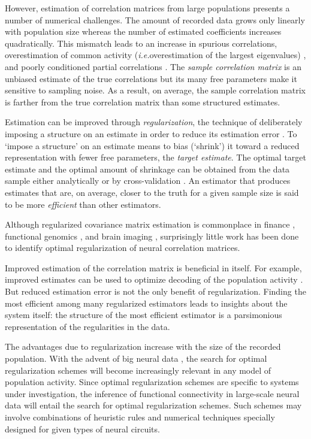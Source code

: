 \documentclass[10pt]{article}
\newcommand{\sq}[1]{\lq#1\rq}
\newcommand{\ie}{\emph{i.e.}\;}
\begin{document}
However, estimation of correlation matrices from large populations presents a number of numerical challenges. The amount of recorded data grows only linearly with population size whereas the number of estimated coefficients increases quadratically. This mismatch leads to an increase in spurious correlations, overestimation of common activity (\ie overestimation of the largest eigenvalues) \cite{Ledoit:2004}, and poorly conditioned partial correlations \cite{Schafer:2005}. The \emph{sample correlation matrix} is an unbiased estimate of the true correlations but its many free parameters make it sensitive to sampling noise. As a result, on average, the sample correlation matrix is farther from the true correlation matrix than some structured estimates. 

Estimation can be improved through \emph{regularization},  the technique of deliberately imposing a structure on an estimate in order to reduce its estimation error \cite{Schafer:2005, Bickel:2006}. To \sq{impose a structure} on an estimate means to bias (\sq{shrink}) it toward a reduced representation  with fewer free parameters, the \emph{target estimate}.   The optimal target estimate and the optimal amount of shrinkage can be obtained from the data sample either analytically \cite{Ledoit:2003, Ledoit:2004, Schafer:2005}  or by cross-validation \cite{Friedman:1989}. An estimator that produces estimates that are, on average, closer to the truth for a given sample size is said to be more \emph{efficient} than other estimators.

Although regularized covariance matrix estimation is commonplace in finance \cite{Ledoit:2003}, functional genomics \cite{Schafer:2005}, and brain imaging \cite{Ryali:2012}, surprisingly little work has been done to identify optimal regularization of neural correlation matrices. 

Improved estimation of the correlation matrix is beneficial in itself. For example, improved estimates can be used to optimize  decoding of the population activity \cite{Friedman:1989}. But reduced estimation error is not the only benefit of regularization.  Finding the most efficient among many regularized estimators leads to insights about the system itself: the structure of the most efficient estimator is a parsimonious representation of the regularities in the data. 

The advantages due to regularization increase with the size of the recorded population. With the advent of  big neural data \cite{Alivisatos:2013}, the search for optimal regularization schemes will become increasingly relevant in any model of population activity. Since optimal regularization schemes are specific to systems under investigation, the inference of functional connectivity in large-scale neural data will entail the search for optimal regularization schemes. Such schemes may involve combinations of heuristic rules and numerical techniques specially designed for given types of neural circuits.
\end{document}
